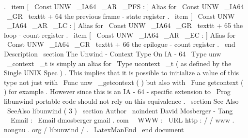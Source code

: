 .
\
item
[
\
Const
{
UNW
\
_IA64
\
_AR
\
_PFS
}
:
]
Alias
for
\
Const
{
UNW
\
_IA64
\
_GR
}
\
texttt
{
+
64
}
the
previous
frame
-
state
register
.
\
item
[
\
Const
{
UNW
\
_IA64
\
_AR
\
_LC
}
:
]
Alias
for
\
Const
{
UNW
\
_IA64
\
_GR
}
\
texttt
{
+
65
}
the
loop
-
count
register
.
\
item
[
\
Const
{
UNW
\
_IA64
\
_AR
\
_EC
}
:
]
Alias
for
\
Const
{
UNW
\
_IA64
\
_GR
}
\
texttt
{
+
66
}
the
epilogue
-
count
register
.
\
end
{
Description
}
\
section
{
The
Unwind
-
Context
Type
}
On
IA
-
64
\
Type
{
unw
\
_context
\
_t
}
is
simply
an
alias
for
\
Type
{
ucontext
\
_t
}
(
as
defined
by
the
Single
UNIX
Spec
)
.
This
implies
that
it
is
possible
to
initialize
a
value
of
this
type
not
just
with
\
Func
{
unw
\
_getcontext
}
(
)
but
also
with
\
Func
{
getcontext
}
(
)
for
example
.
However
since
this
is
an
IA
-
64
-
specific
extension
to
\
Prog
{
libunwind
}
portable
code
should
not
rely
on
this
equivalence
.
\
section
{
See
Also
}
\
SeeAlso
{
libunwind
(
3
)
}
\
section
{
Author
}
\
noindent
David
Mosberger
-
Tang
\
\
Email
:
\
Email
{
dmosberger
gmail
.
com
}
\
\
WWW
:
\
URL
{
http
:
/
/
www
.
nongnu
.
org
/
libunwind
/
}
.
\
LatexManEnd
\
end
{
document
}
